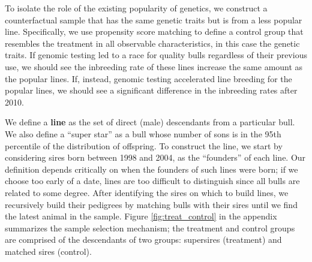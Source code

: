 \documentclass[12pt,letterpaper]{article}
\begin{document}
To isolate the role of the existing popularity of genetics, we construct a counterfactual sample that has the same genetic traits but is from a less popular line.
Specifically, we use propensity score matching \citep{Smith2005} to define a control group that resembles the treatment in all observable characteristics, in this case the genetic traits. 
If genomic testing led to a race for quality bulls regardless of their previous use, we should see the inbreeding rate of these lines increase the same amount as the popular lines.
If, instead, genomic testing accelerated line breeding for the popular lines, we should see a significant difference in the inbreeding rates after 2010.

We define a \textbf{line} as the set of direct (male) descendants from a particular bull.
We also define a ``super star'' as a bull whose number of sons is in the 95th percentile of the distribution of offspring. 
To construct the line, we start by considering sires born between 1998 and 2004, as the ``founders'' of each line.
Our definition depends critically on when the founders of such lines were born; if we choose too early of a date, lines are too difficult to distinguish since all bulls are related to some degree.
After identifying the sires on which to build lines, we recursively build their pedigrees by matching bulls with their sires until we find the latest animal in the sample. 
Figure \ref{fig:treat_control} in the appendix summarizes the sample selection mechanism; the treatment and control groups are comprised of the descendants of two groups: supersires (treatment) and matched sires (control).


\end{document}
